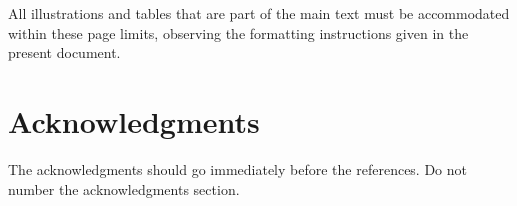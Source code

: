 \documentclass[11pt,a4paper]{article}
\begin{document}
All illustrations and tables that are part
of the main text must be accommodated within these page limits, observing
the formatting instructions given in the present document. 




\section*{Acknowledgments}

The acknowledgments should go immediately before the references.  Do
not number the acknowledgments section. 

%
%






\end{document}
